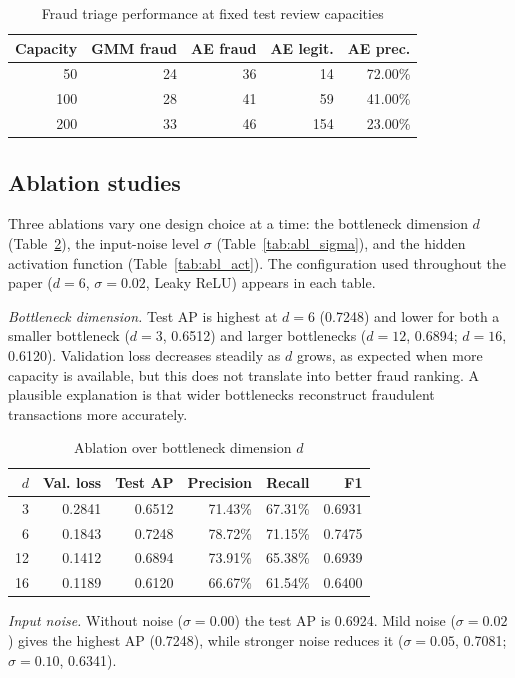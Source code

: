 \documentclass[conference]{IEEEtran}
\begin{document}
\begin{table}[t]
\caption{Fraud triage performance at fixed test review capacities}
\label{tab:topk}
\centering
\scriptsize
\begin{tabular}{rrrrr}
\toprule
Capacity & GMM fraud & AE fraud & AE legit. & AE prec.\\
\midrule
50 & 24 & 36 & 14 & 72.00\%\\
100 & 28 & 41 & 59 & 41.00\%\\
200 & 33 & 46 & 154 & 23.00\%\\
\bottomrule
\end{tabular}
\end{table}

\subsection{Ablation studies}
Three ablations vary one design choice at a time: the bottleneck dimension $d$ (Table~\ref{tab:abl_d}), the input-noise level $\sigma$ (Table~\ref{tab:abl_sigma}), and the hidden activation function (Table~\ref{tab:abl_act}). The configuration used throughout the paper ($d=6$, $\sigma=0.02$, Leaky ReLU) appears in each table.

\textit{Bottleneck dimension.} Test AP is highest at $d=6$ (0.7248) and lower for both a smaller bottleneck ($d=3$, 0.6512) and larger bottlenecks ($d=12$, 0.6894; $d=16$, 0.6120). Validation loss decreases steadily as $d$ grows, as expected when more capacity is available, but this does not translate into better fraud ranking. A plausible explanation is that wider bottlenecks reconstruct fraudulent transactions more accurately.

\begin{table}[t]
\caption{Ablation over bottleneck dimension $d$}
\label{tab:abl_d}
\centering
\small
\begin{tabular}{rrrrrr}
\toprule
$d$ & Val. loss & Test AP & Precision & Recall & F1\\
\midrule
3 & 0.2841 & 0.6512 & 71.43\% & 67.31\% & 0.6931\\
6 & 0.1843 & 0.7248 & 78.72\% & 71.15\% & 0.7475\\
12 & 0.1412 & 0.6894 & 73.91\% & 65.38\% & 0.6939\\
16 & 0.1189 & 0.6120 & 66.67\% & 61.54\% & 0.6400\\
\bottomrule
\end{tabular}
\end{table}

\textit{Input noise.} Without noise ($\sigma=0.00$) the test AP is 0.6924. Mild noise ($\sigma=0.02$) gives the highest AP (0.7248), while stronger noise reduces it ($\sigma=0.05$, 0.7081; $\sigma=0.10$, 0.6341).
\end{document}
